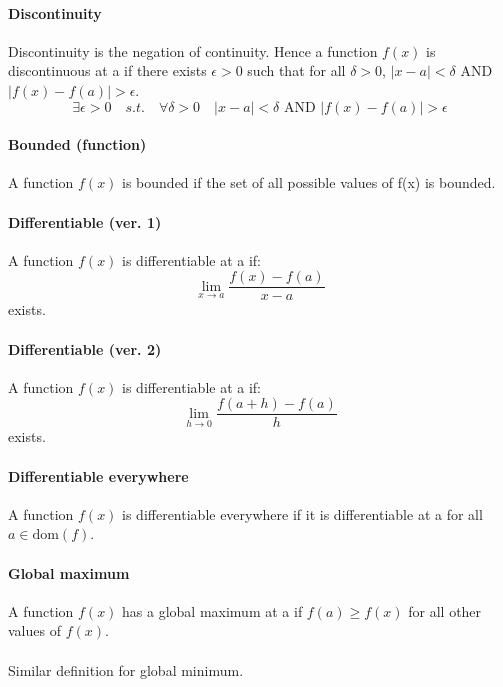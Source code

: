 \documentclass{scrartcl}
\begin{document}
\paragraph{Discontinuity}
Discontinuity is the negation of continuity. Hence a function $ f(x) $ is discontinuous at a if there exists $ \epsilon > 0 $ such that for all $ \delta > 0 $, $ |x - a| < \delta $ AND $ |f(x) - f(a)| > \epsilon $.
\begin{equation}
\exists \epsilon > 0 \quad s.t. \quad \forall \delta > 0 \quad |x - a| < \delta \textrm{ AND } |f(x) - f(a)| > \epsilon
\end{equation}

\paragraph{Bounded (function)}
A function $ f(x) $ is bounded if the set of all possible values of f(x) is bounded.

\paragraph{Differentiable (ver. 1)}
A function $ f(x) $ is differentiable at a if:
\begin{equation}
\lim_{x \to a}\frac{f(x) - f(a)}{x - a}
\end{equation}
exists.

\paragraph{Differentiable (ver. 2)}
A function $ f(x) $ is differentiable at a if:
\begin{equation}
\lim_{h \to 0}\frac{f(a + h) - f(a)}{h}
\end{equation}
exists.

\paragraph{Differentiable everywhere}
A function $ f(x) $ is differentiable everywhere if it is differentiable at a for all $ a \in \textrm{dom}(f) $.

\paragraph{Global maximum}
A function $ f(x) $ has a global maximum at a if $ f(a) \geq f(x) $ for all other values of $ f(x) $.
\\\\
Similar definition for global minimum.
\end{document}
